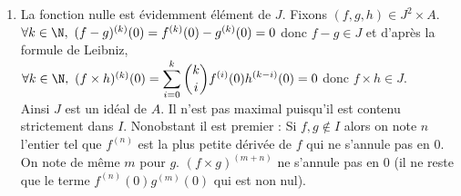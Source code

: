 \documentclass[8pt]{book}
\begin{document}
\begin{enumerate}[leftmargin=*]
\begin{enumerate}[label=\alph*.]
			Ainsi $I$ est un idéal de $A$. Montrons qu'il est principal.\\
			Soit $f\in I$. Montrons que $g:x\mapsto \begin{cases}
				\displaystyle\frac{f(x)}{x}&\mbox{si }x\ne 0\\
				f'(0)&\mbox{si }x=0
			\end{cases}$ est $\mathcal C^\infty$ sur $\R$.\\
			$\forall x\in \R^*,\ f(x)=\displaystyle\int_0^xf'(t)dt=x\int_0^1f'(ux)du$ c'est à dire $\forall x\in \R^*,\ g(x)=\displaystyle\int_0^1f'(ux)du$. L'égalité est encore vraie pour $x=0$.\\
			De plus, $h:(u,x)\mapsto f'(ux)$ est de classe $\mathcal C^\infty$ sur $\R\times[0,1]$ par composition et pour tout $k\in \N,\ \dpartial{h}{k}{x}(u,x)=u^kf^{(k+1)}(ux)$ est continue sur $\R\times[0,1]$. On peut donc dominer $u\mapsto\dpartial{h}{k}{x}$ par $\varphi:u\mapsto \normep{\infty,[a,b]}{u\mapsto\dpartial{h}{k}{x}}$ sur un segment $[a,b]\subset \R$.\\
			Ainsi $g\in A$ par le théorème de transfert $\mathcal C^\infty$.\\
			Donc $f=\Id_\R\times g\in \Id_\R A$.\\
			Réciproquement $\Id_\R\in I$ donc $\Id_\R A\subset I$ d'où $I=\Id_\R A$.\\
			Montrons que $I$ est maximal. Soient $f\notin I$ et $g\in A$.\\
			$\forall x\in \R,\ g(x)=\displaystyle\left(g(x)-\frac{g(0)}{f(0)}f(x)\right)+\frac{g(0)}{f(0)}f(x)$.\\
			$h:x\in \R\mapsto \displaystyle g(x)-\frac{g(0)}{f(0)}f(x)\in I$ et $\displaystyle\frac{g(0)}{f(0)}f\in fA$ donc $g\in I+fA$.\\
			Ainsi $I+fA=A$ et $I$ est maximal. D'après la question précédente il est donc premier.
			\item La fonction nulle est évidemment élément de $J$. Fixons $(f,g,h)\in J^2\times A$.\\
			$\forall k\in \N,\ (f-g)^{(k)}(0)=f^{(k)}(0)-g^{(k)}(0)=0$ donc $f-g\in J$ et d'après la formule de Leibniz,\\
			$\forall k\in \N,\ (f\times h)^{(k)}(0)=\displaystyle\sum_{i=0}^k\binom{k}{i}f^{(i)}(0)h^{(k-i)}(0)=0$ donc $f\times h\in J$.\\
			Ainsi $J$ est un idéal de $A$. Il n'est pas maximal puisqu'il est contenu strictement dans $I$. Nonobstant il est premier :
			Si $f,g\notin I$ alors on note $n$ l'entier tel que $f^{(n)}$ est la plus petite dérivée de $f$ qui ne s'annule pas en $0$. On note de même $m$ pour $g$. $(f\times g)^{(m+n)}$ ne s'annule pas en $0$ (il ne reste que le terme $f^{(n)}(0)g^{(m)}(0)$ qui est non nul).\\\\

\end{enumerate}
\end{enumerate}
\end{document}

